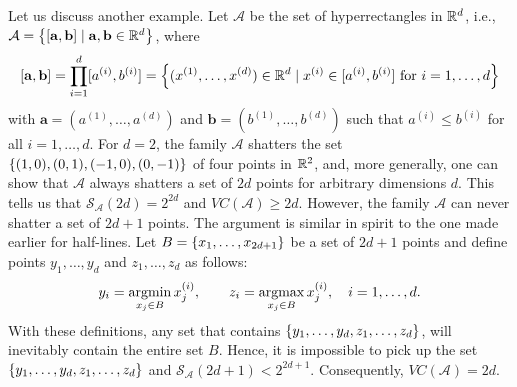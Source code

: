 Let us discuss another example. Let $\mathcal{A}$ be the set of hyperrectangles in $\mathbb{R}^d$, i.e., $\mathcal{A} = \left\{[\mathbf{a}, \mathbf{b}] \mathrel{|} \mathbf{a}, \mathbf{b} \in \mathbb{R}^d\right\}$, where
\[
    [\mathbf{a}, \mathbf{b}] = \prod_{i=1}^d [a^{(i)}, b^{(i)}] = \left\{(x^{(1)}, \dots, x^{(d)}) \in \mathbb{R}^d \mathrel{|} x^{(i)} \in [a^{(i)}, b^{(i)}] \text{ for } i = 1, \dots, d\right\}
\]
with $\mathbf{a} = (a^{(1)}, \dots, a^{(d)})$ and $\mathbf{b} = (b^{(1)}, \dots, b^{(d)})$ such that $a^{(i)} \leq b^{(i)}$ for all $i = 1, \dots, d$. For $d=2$, the family $\mathcal{A}$ shatters the set $\left\{(1, 0), (0, 1), (-1, 0), (0, -1)\right\}$ of four points in $\mathbb{R}^2$, and, more generally, one can show that $\mathcal{A}$ always shatters a set of $2d$ points for arbitrary dimensions $d$. This tells us that $\mathcal{S}_{\mathcal{A}}(2d) = 2^{2d}$ and $VC(\mathcal{A}) \geq 2d$. However, the family $\mathcal{A}$ can never shatter a set of $2d + 1$ points. The argument is similar in spirit to the one made earlier for half-lines. Let $B = \left\{x_1, \dots, x_{2d+1}\right\}$ be a set of $2d + 1$ points and define points $y_1, \dots, y_d$ and $z_1, \dots, z_d$ as follows:
\[
    y_i = \operatorname*{argmin}_{x_j \in B} x_j^{(i)}, \quad\quad z_i = \operatorname*{argmax}_{x_j \in B} x_j^{(i)}, \quad i = 1, \dots, d.
\]
With these definitions, any set that contains $\left\{y_1, \dots, y_d, z_1, \dots, z_d\right\}$, will inevitably contain the entire set $B$. Hence, it is impossible to pick up the set $\left\{y_1, \dots, y_d, z_1, \dots, z_d\right\}$ and $\mathcal{S}_{\mathcal{A}}(2d + 1) < 2^{2d + 1}$. Consequently, $VC(\mathcal{A}) = 2d$.
